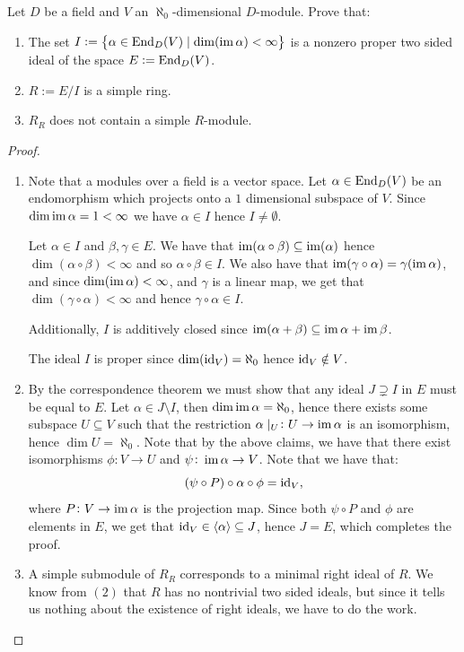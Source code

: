 \documentclass[11pt,a4paper]{article}
\begin{document}
\begin{exercise}
  \label{ex:simplicity-in-infinite-dimensions}
  Let $D$ be a field and $V$ an $\aleph_0$-dimensional $D$-module.
  Prove that:
  \begin{enumerate}
    \item[(1)] The set
    $I := \left\{\alpha \in \operatorname{End}_D(V) \mid \dim(\operatorname{im} \alpha) < \infty\right\}$
    is a nonzero proper two sided ideal of the space $E := \operatorname{End}_D(V)$.
    \item[(2)] $R := E/I$ is a simple ring.
    \item[(3)] $R_R$ does not contain a simple $R$-module.
  \end{enumerate}
\end{exercise}
\begin{proof} \phantom{}
  \begin{enumerate}
    \item[(1)] Note that a modules over a field is a vector space.
      Let $\alpha \in \operatorname{End}_D(V)$ be an endomorphism which projects
      onto a $1$ dimensional subspace of $V$.
      Since $\dim \operatorname{im} \alpha = 1 < \infty$ we have $\alpha \in I$
      hence $I \neq \emptyset$.

      Let $\alpha \in I$ and $\beta,\gamma \in E$.
      We have that $\operatorname{im}(\alpha \circ \beta) \subseteq \operatorname{im}(\alpha)$
      hence $\dim(\alpha \circ \beta) < \infty$
      and so $\alpha \circ \beta \in I$.
      We also have that $\operatorname{im}(\gamma \circ \alpha) = \gamma(\operatorname{im} \alpha)$,
      and since $\dim(\operatorname{im} \alpha) < \infty$, and $\gamma$
      is a linear map, we get that $\dim(\gamma \circ \alpha) < \infty$
      and hence $\gamma \circ \alpha \in I$.
      
      Additionally, $I$ is additively closed since
      $\operatorname{im}(\alpha + \beta) \subseteq \operatorname{im} \alpha + \operatorname{im} \beta$.

      The ideal $I$ is proper since $\dim(\operatorname{id}_V) = \aleph_0$
      hence $\operatorname{id}_V \notin V$.
    \item[(2)] By the correspondence theorem we must show that any ideal
      $J \supsetneq I$ in $E$ must be equal to $E$.
      Let $\alpha \in J \setminus I$,
      then $\dim \operatorname{im} \alpha = \aleph_0$,
      hence there exists some subspace $U \subseteq V$ such that the restriction
      $\alpha \mid_U \colon U \to \operatorname{im} \alpha$ is an isomorphism,
      hence $\dim U = \aleph_0$.
      Note that by the above claims, we have that
      there exist isomorphisms $\phi \colon V \to U$
      and $\psi \colon \operatorname{im} \alpha \to V$.
      Note that we have that:
      \[
        (\psi \circ P) \circ \alpha \circ \phi = \operatorname{id}_V,
      \]
      where $P \colon V \to \operatorname{im} \alpha$ is the projection map.
      Since both $\psi \circ P$ and $\phi$ are elements in $E$,
      we get that $\operatorname{id}_V \in \langle \alpha \rangle \subseteq J$,
      hence $J = E$, which completes the proof.
    \item[(3)] A simple submodule of $R_R$ corresponds to a minimal
      right ideal of $R$.
      We know from $(2)$ that $R$ has no nontrivial two sided ideals,
      but since it tells us nothing about the existence of right ideals,
      we have to do the work.


\end{enumerate}
\end{proof}
\end{document}
